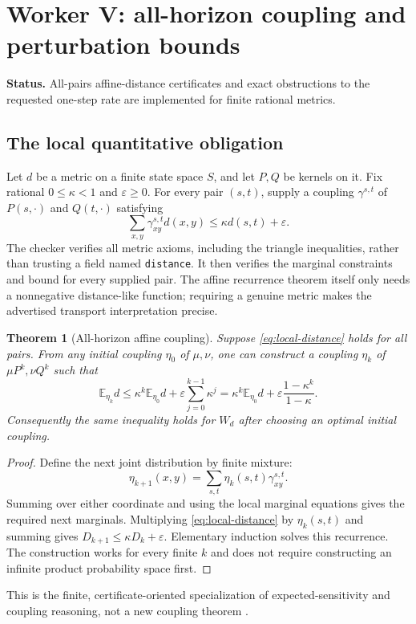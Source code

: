 \documentclass[11pt,letterpaper]{article}
\newtheorem{theorem}{Theorem}[section]
\theoremstyle{definition}\newtheorem{definition}[theorem]{Definition}
\theoremstyle{remark}\newtheorem{remark}[theorem]{Remark}
\newcommand{\E}{\mathbb E}\newcommand{\Prob}{\mathbb P}
\newcommand{\code}[1]{\texttt{#1}}
\newcommand{\status}[1]{\par\noindent\textbf{Status.} #1\par}
\begin{document}
\section{Worker V: all-horizon coupling and perturbation bounds}
\status{All-pairs affine-distance certificates and exact obstructions to the requested one-step rate are implemented for finite rational metrics.}
\subsection{The local quantitative obligation}
Let $d$ be a metric on a finite state space $S$, and let $P,Q$ be kernels on it. Fix rational $0\le\kappa<1$ and $\varepsilon\ge0$. For every pair $(s,t)$, supply a coupling $\gamma^{s,t}$ of $P(s,\cdot)$ and $Q(t,\cdot)$ satisfying
\begin{equation}\label{eq:local-distance}
 \sum_{x,y}\gamma^{s,t}_{xy}d(x,y)
 \le\kappa d(s,t)+\varepsilon.
\end{equation}
The checker verifies all metric axioms, including the triangle inequalities, rather than trusting a field named \code{distance}. It then verifies the marginal constraints and bound for every supplied pair. The affine recurrence theorem itself only needs a nonnegative distance-like function; requiring a genuine metric makes the advertised transport interpretation precise.

\begin{theorem}[All-horizon affine coupling]\label{thm:contraction}
Suppose \eqref{eq:local-distance} holds for all pairs. From any initial coupling $\eta_0$ of $\mu,\nu$, one can construct a coupling $\eta_k$ of $\mu P^k,\nu Q^k$ such that
\[
 \E_{\eta_k}d\le
 \kappa^k\E_{\eta_0}d+
 \varepsilon\sum_{j=0}^{k-1}\kappa^j
 =\kappa^k\E_{\eta_0}d+
 \varepsilon\frac{1-\kappa^k}{1-\kappa}.
\]
Consequently the same inequality holds for $W_d$ after choosing an optimal initial coupling.
\end{theorem}
\begin{proof}
Define the next joint distribution by finite mixture:
\[
 \eta_{k+1}(x,y)=\sum_{s,t}\eta_k(s,t)\gamma^{s,t}_{xy}.
\]
Summing over either coordinate and using the local marginal equations gives the required next marginals. Multiplying \eqref{eq:local-distance} by $\eta_k(s,t)$ and summing gives $D_{k+1}\le\kappa D_k+\varepsilon$. Elementary induction solves this recurrence. The construction works for every finite $k$ and does not require constructing an infinite product probability space first.
\end{proof}
This is the finite, certificate-oriented specialization of expected-sensitivity and coupling reasoning, not a new coupling theorem \cite{sensitivity,coupling}.
\end{document}
